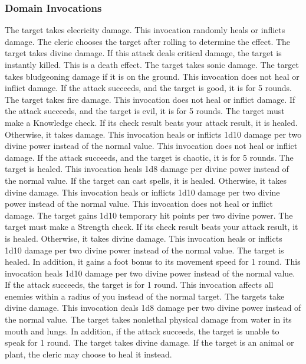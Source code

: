 \subsubsection{Domain Invocations}\label{Domain Invocations}

    The target takes elecricity damage.
    This invocation randomly heals or inflicts damage.
    The cleric chooses the target after rolling to determine the effect.
    The target takes divine damage.
    If this attack deals critical damage, the target is instantly killed.
    This is a death effect.
    The target takes sonic damage.
    The target takes bludgeoning damage if it is on the ground.
    This invocation does not heal or inflict damage.
    If the attack succeeds, and the target is good, it is \staggered for 5 rounds.
    The target takes fire damage.
    This invocation does not heal or inflict damage.
    If the attack succeeds, and the target is evil, it is \dazed for 5 rounds.
    The target must make a Knowledge check.
    If its check result beats your attack result, it is healed.
    Otherwise, it takes damage.
    This invocation heals or inflicts 1d10 damage per two divine power instead of the normal value.
    This invocation does not heal or inflict damage.
    If the attack succeeds, and the target is chaotic, it is \immobilized for 5 rounds.
    The target is healed.
    This invocation heals 1d8 damage per divine power instead of the normal value.
    If the target can cast spells, it is healed.
    Otherwise, it takes divine damage.
    This invocation heals or inflicts 1d10 damage per two divine power instead of the normal value.
    This invocation does not heal or inflict damage.
    The target gains 1d10 temporary hit points per two divine power.
    The target must make a Strength check.
    If its check result beats your attack result, it is healed.
    Otherwise, it takes divine damage.
    This invocation heals or inflicts 1d10 damage per two divine power instead of the normal value.
    The target is healed.
    In addition, it gains a  foot bonus to its movement speed for 1 round.
    This invocation heals 1d10 damage per two divine power instead of the normal value.
    If the attack succeeds, the target is \disoriented for 1 round.
    This invocation affects all enemies within a \areasmall radius of you instead of the normal target.
    The targets take divine damage.
    This invocation deals 1d8 damage per two divine power instead of the normal value.
    The target takes nonlethal physical damage from water in its mouth and lungs.
    In addition, if the attack succeeds, the target is unable to speak for 1 round.
    The target takes divine damage.
    If the target is an animal or plant, the cleric may choose to heal it instead.

